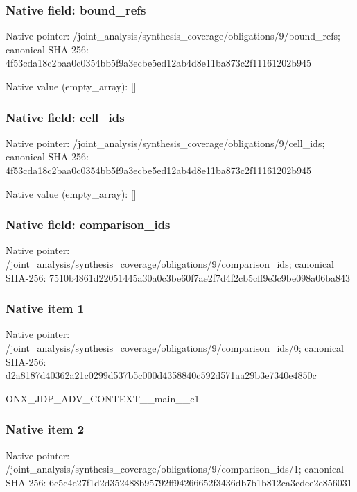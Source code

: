 \documentclass[10pt,a4paper]{article}
\begin{document}
\subsubsection{Native field: bound\_\allowbreak{}refs}
Native pointer: /joint\_\allowbreak{}analysis/synthesis\_\allowbreak{}coverage/obligations/9/bound\_\allowbreak{}refs; canonical SHA-256: 4f53cda18c2baa0c0354bb5f9a3ecbe5ed12ab4d8e11ba873c2f11161202b945

Native value (empty\_\allowbreak{}array): []

\subsubsection{Native field: cell\_\allowbreak{}ids}
Native pointer: /joint\_\allowbreak{}analysis/synthesis\_\allowbreak{}coverage/obligations/9/cell\_\allowbreak{}ids; canonical SHA-256: 4f53cda18c2baa0c0354bb5f9a3ecbe5ed12ab4d8e11ba873c2f11161202b945

Native value (empty\_\allowbreak{}array): []

\subsubsection{Native field: comparison\_\allowbreak{}ids}
Native pointer: /joint\_\allowbreak{}analysis/synthesis\_\allowbreak{}coverage/obligations/9/comparison\_\allowbreak{}ids; canonical SHA-256: 7510b4861d22051445a30a0c3be60f7ae2f7d4f2cb5cff9e3c9be098a06ba843

\subsubsection{Native item 1}
Native pointer: /joint\_\allowbreak{}analysis/synthesis\_\allowbreak{}coverage/obligations/9/comparison\_\allowbreak{}ids/0; canonical SHA-256: d2a8187d40362a21c0299d537b5c000d4358840c592d571aa29b3e7340e4850c

\begingroup\raggedright\sloppy ONX\_\allowbreak{}JDP\_\allowbreak{}ADV\_\allowbreak{}CONTEXT\_\allowbreak{}\_\allowbreak{}main\_\allowbreak{}\_\allowbreak{}c1\par\endgroup

\subsubsection{Native item 2}
Native pointer: /joint\_\allowbreak{}analysis/synthesis\_\allowbreak{}coverage/obligations/9/comparison\_\allowbreak{}ids/1; canonical SHA-256: 6c5c4c27f1d2d352488b95792ff94266652f3436db7b1b812ca3cdee2e856031
\end{document}
